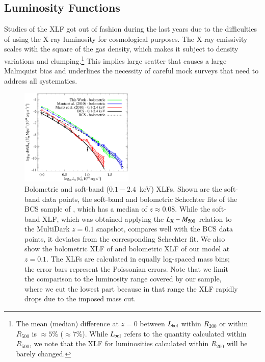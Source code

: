 \documentclass[useAMS,usenatbib]{mn2e}
\begin{document}
\subsection{Luminosity Functions}
Studies of the XLF got out of fashion during the last years due to the
difficulties of using the X-ray luminosity for cosmological purposes. The X-ray
emissivity scales with the square of the gas density, which makes it subject to
density variations and clumping.\footnote{The mean (median) difference at $z=0$
  between $L_{{\mathrm{bol}}}$ within $R_{200}$ or within $R_{500}$ is $\approx 5\%$
  ($\approx 7\%$). While $L_{{\mathrm{bol}}}$ refers to the quantity calculated
  within $R_{500}$, we note that the XLF for luminosities calculated within
  $R_{200}$ will be barely changed.} This implies large scatter that causes a
large Malmquist bias and underlines the necessity of careful mock surveys that
need to address all systematics.

\begin{figure} 
\centering
\includegraphics[width=0.48\textwidth]{figures/xlf.eps}
\caption{Bolometric and soft-band ($0.1-2.4$~keV) XLFs. Shown are the soft-band
  data points, the soft-band and bolometric Schechter fits of the BCS sample of
  \protect\cite{1997ApJ...479L.101E}, which has a median of $z \approx 0.08$.  While the
  soft-band XLF, which was obtained applying the \protect\cite{2010MNRAS.406.1773M}
  $L_{{\mathrm{X}}}-M_{500}$ relation to the MultiDark $z = 0.1$ snapshot, compares
  well with the BCS data points, it deviates from the corresponding Schechter
  fit. We also show the bolometric XLF of \protect\cite{2010MNRAS.406.1773M} and
  bolometric XLF of our model at $z=0.1$. The XLFs are calculated in equally
  log-spaced mass bins; the error bars represent the Poissonian errors. Note
  that we limit the comparison to the luminosity range covered by our sample,
  where we cut the lowest part because in that range the XLF rapidly drops due
  to the imposed mass cut.}
\label{fig:XLF}
\end{figure}
\end{document}
